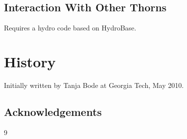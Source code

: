 \subsection{Interaction With Other Thorns}

Requires a hydro code based on HydroBase.

\section{History}

Initially written by Tanja Bode at Georgia Tech, May 2010.

\subsection{Acknowledgements}


\begin{thebibliography}{9}

\end{thebibliography}



